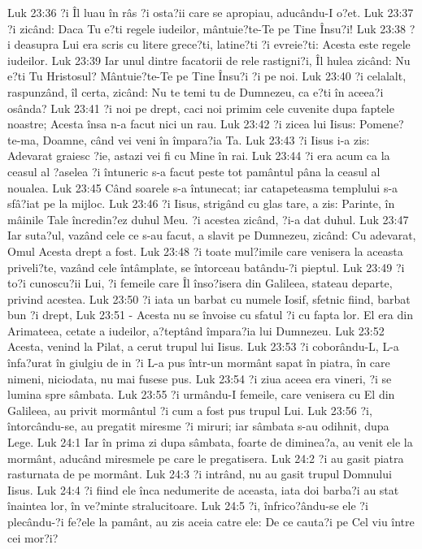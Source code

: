 Luk 23:36  ?i Îl luau în râs ?i osta?ii care se apropiau, aducându-I o?et.
Luk 23:37  ?i zicând: Daca Tu e?ti regele iudeilor, mântuie?te-Te pe Tine Însu?i!
Luk 23:38  ?i deasupra Lui era scris cu litere grece?ti, latine?ti ?i evreie?ti: Acesta este regele iudeilor.
Luk 23:39  Iar unul dintre facatorii de rele rastigni?i, Îl hulea zicând: Nu e?ti Tu Hristosul? Mântuie?te-Te pe Tine Însu?i ?i pe noi.
Luk 23:40  ?i celalalt, raspunzând, îl certa, zicând: Nu te temi tu de Dumnezeu, ca e?ti în aceea?i osânda?
Luk 23:41  ?i noi pe drept, caci noi primim cele cuvenite dupa faptele noastre; Acesta însa n-a facut nici un rau.
Luk 23:42  ?i zicea lui Iisus: Pomene?te-ma, Doamne, când vei veni în împara?ia Ta.
Luk 23:43  ?i Iisus i-a zis: Adevarat graiesc ?ie, astazi vei fi cu Mine în rai.
Luk 23:44  ?i era acum ca la ceasul al ?aselea ?i întuneric s-a facut peste tot pamântul pâna la ceasul al noualea.
Luk 23:45  Când soarele s-a întunecat; iar catapeteasma templului s-a sfâ?iat pe la mijloc.
Luk 23:46  ?i Iisus, strigând cu glas tare, a zis: Parinte, în mâinile Tale încredin?ez duhul Meu. ?i acestea zicând, ?i-a dat duhul.
Luk 23:47  Iar suta?ul, vazând cele ce s-au facut, a slavit pe Dumnezeu, zicând: Cu adevarat, Omul Acesta drept a fost.
Luk 23:48  ?i toate mul?imile care venisera la aceasta priveli?te, vazând cele întâmplate, se întorceau batându-?i pieptul.
Luk 23:49  ?i to?i cunoscu?ii Lui, ?i femeile care Îl înso?isera din Galileea, stateau departe, privind acestea.
Luk 23:50  ?i iata un barbat cu numele Iosif, sfetnic fiind, barbat bun ?i drept,
Luk 23:51  - Acesta nu se învoise cu sfatul ?i cu fapta lor. El era din Arimateea, cetate a iudeilor, a?teptând împara?ia lui Dumnezeu.
Luk 23:52  Acesta, venind la Pilat, a cerut trupul lui Iisus.
Luk 23:53  ?i coborându-L, L-a înfa?urat în giulgiu de in ?i L-a pus într-un mormânt sapat în piatra, în care nimeni, niciodata, nu mai fusese pus.
Luk 23:54  ?i ziua aceea era vineri, ?i se lumina spre sâmbata.
Luk 23:55  ?i urmându-I femeile, care venisera cu El din Galileea, au privit mormântul ?i cum a fost pus trupul Lui.
Luk 23:56  ?i, întorcându-se, au pregatit miresme ?i miruri; iar sâmbata s-au odihnit, dupa Lege.
Luk 24:1  Iar în prima zi dupa sâmbata, foarte de diminea?a, au venit ele la mormânt, aducând miresmele pe care le pregatisera.
Luk 24:2  ?i au gasit piatra rasturnata de pe mormânt.
Luk 24:3  ?i intrând, nu au gasit trupul Domnului Iisus.
Luk 24:4  ?i fiind ele înca nedumerite de aceasta, iata doi barba?i au stat înaintea lor, în ve?minte stralucitoare.
Luk 24:5  ?i, înfrico?ându-se ele ?i plecându-?i fe?ele la pamânt, au zis aceia catre ele: De ce cauta?i pe Cel viu între cei mor?i?
